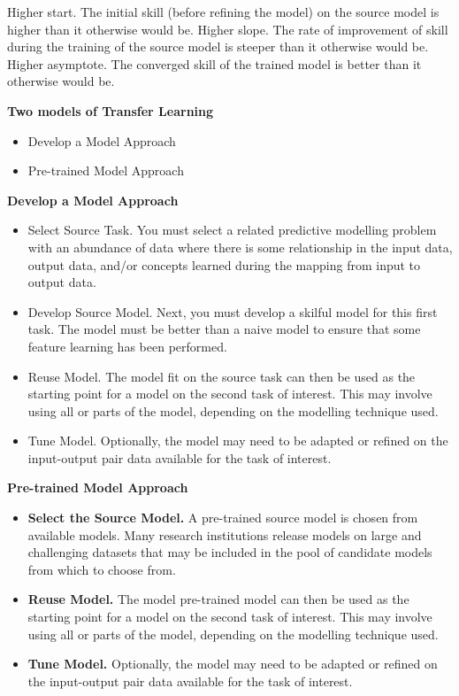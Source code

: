 Higher start. The initial skill (before refining the model) on the source model is higher than it otherwise would be.
Higher slope. The rate of improvement of skill during the training of the source model is steeper than it otherwise would be.
Higher asymptote. The converged skill of the trained model is better than it otherwise would be.

\textbf{Two models of Transfer Learning}
\begin{itemize}
	\item Develop a Model Approach
	\item Pre-trained Model Approach
\end{itemize}

\textbf{Develop a Model Approach}

\begin{itemize}
\item Select Source Task. You must select a related predictive modelling problem with an abundance of data where there is some relationship in the input data, output data, and/or concepts learned during the mapping from input to output data.
\item Develop Source Model. Next, you must develop a skilful model for this first task. The model must be better than a naive model to ensure that some feature learning has been performed.
\item Reuse Model. The model fit on the source task can then be used as the starting point for a model on the second task of interest. This may involve using all or parts of the model, depending on the modelling technique used.
\item Tune Model. Optionally, the model may need to be adapted or refined on the input-output pair data available for the task of interest.
\end{itemize}

\textbf{Pre-trained Model Approach}
\begin{itemize}
\item \textbf{Select the Source Model.} A pre-trained source model is chosen from available models. Many research institutions release models on large and challenging datasets that may be included in the pool of candidate models from which to choose from.
\item \textbf{Reuse Model.} The model pre-trained model can then be used as the starting point for a model on the second task of interest. This may involve using all or parts of the model, depending on the modelling technique used.
\item \textbf{Tune Model.} Optionally, the model may need to be adapted or refined on the input-output pair data available for the task of interest.
\end{itemize}



